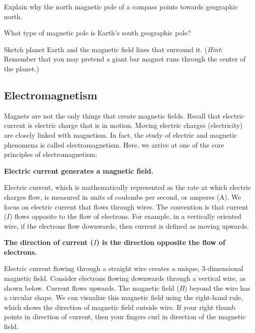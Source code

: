 \documentclass{article}
\numberwithin{equation}{section}
\numberwithin{figure}{section}
\begin{document}
\begin{exercise}
    Explain why the north magnetic pole of a compass points towards geographic north. 
\end{exercise}

\begin{exercise}
    What type of magnetic pole is Earth's south geographic pole?
\end{exercise}

\begin{exercise}
    Sketch planet Earth and the magnetic field lines that surround it. (\textit{Hint}: Remember that you may pretend a giant bar magnet runs through the center of the planet.) 
\end{exercise}

\clearpage
\subsection{Electromagnetism} \label{okuZoJ}


Magnets are not the only things that create magnetic fields. Recall that electric current is electric charge that is in motion. Moving electric charges (electricity) are closely linked with magnetism. In fact, the study of electric and magnetic phenomena is called \gls{electromagnetism}. Here, we arrive at one of the core principles of electromagnetism:

\begin{mdframed}[backgroundcolor=black!10]
    \centering
    \textbf{Electric current generates a magnetic field.}
\end{mdframed}



Electric current, which is mathematically represented as the rate at which electric charges flow, is measured in units of coulombs per second, or amperes (A). We focus on electric current that flows through wires. The convention is that current ($I$) flows opposite to the flow of electrons. For example, in a vertically oriented wire, if the electrons flow downwards, then current is defined as moving upwards.

\begin{mdframed}[backgroundcolor=black!10]
    \centering
    \textbf{The direction of current ($I$) is the direction opposite the flow of electrons.}
\end{mdframed}

Electric current flowing through a straight wire creates a unique, 3-dimensional magnetic field. Consider electrons flowing downwards through a vertical wire, as shown below. Current flows upwards. The magnetic field ($B$) beyond the wire has a circular shape. We can visualize this magnetic field using the \gls{right-hand rule}, which shows the direction of magnetic field outside wire. If your right thumb points in direction of current, then your fingers curl in direction of the magnetic field. 
\end{document}
